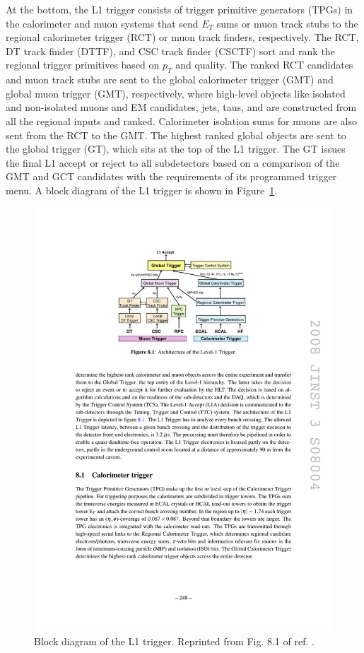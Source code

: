 \documentclass[dissertation.tex]{subfiles}
\begin{document}
At the bottom, the L1 trigger consists of trigger primitive generators (TPGs) in the calorimeter and muon systems that send $E_{T}$ sums or muon track stubs to the regional calorimeter trigger (RCT) or muon track finders, respectively.  The RCT, DT track finder (DTTF), and CSC track finder (CSCTF) sort and rank the regional trigger primitives based on $p_{T}$ and quality.  The ranked RCT candidates and muon track stubs are sent to the global calorimeter trigger (GMT) and global muon trigger (GMT), respectively, where high-level objects like isolated and non-isolated muons and EM candidates, jets, taus, and \MET are constructed from all the regional inputs and ranked.  Calorimeter isolation sums for muons are also sent from the RCT to the GMT.  The highest ranked global objects are sent to the global trigger (GT), which sits at the top of the L1 trigger.  The GT issues the final L1 accept or reject to all subdetectors based on a comparison of the GMT and GCT candidates with the requirements of its programmed trigger menu.  A block diagram of the L1 trigger is shown in Figure~\ref{fig:L1_trigger_diagram}.

\begin{figure}
	\centering
	\includegraphics[scale=1.0]{L1_trigger_diagram}
	\caption{Block diagram of the L1 trigger.  Reprinted from Fig. 8.1 of ref. \cite{CMS_detector_paper}.}
	\label{fig:L1_trigger_diagram}
\end{figure}
\end{document}
